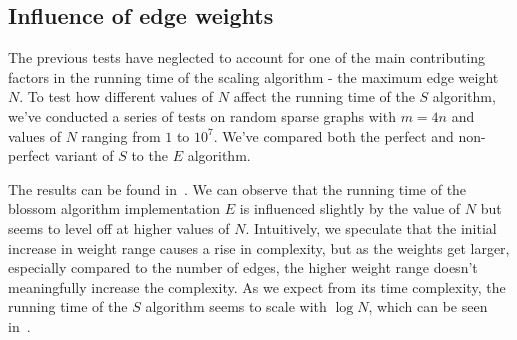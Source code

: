 \subsection{Influence of edge weights}

The previous tests have neglected to account for one of the main contributing factors in the running time of the scaling algorithm - the maximum edge weight $N$. To test how different values of $N$ affect the running time of the $S$ algorithm, we've conducted a series of tests on random sparse graphs with $m = 4n$ and values of $N$ ranging from $1$ to $10^7$. We've compared both the perfect and non-perfect variant of $S$ to the $E$ algorithm. 

The results can be found in~. We can observe that the running time of the blossom algorithm implementation $E$ is influenced slightly by the value of $N$ but seems to level off at higher values of $N$. Intuitively, we speculate that the initial increase in weight range causes a rise in complexity, but as the weights get larger, especially compared to the number of edges, the higher weight range doesn't meaningfully increase the complexity. As we expect from its time complexity, the running time of the $S$ algorithm seems to scale with $\log N$, which can be seen in~.

